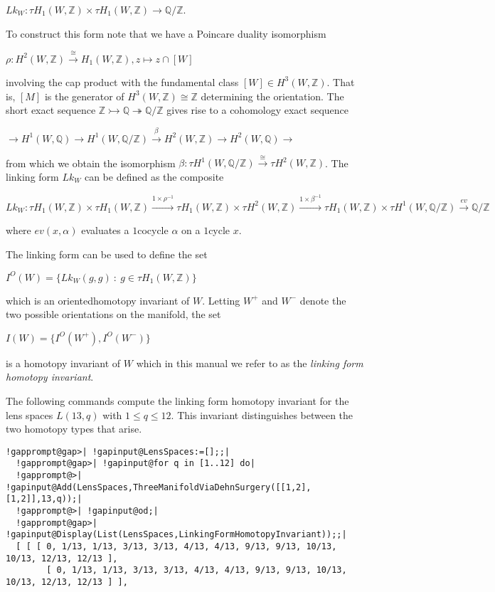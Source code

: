 \documentclass[a4paper,11pt]{report}
\begin{document}
{{$Lk_W\colon \tau H_1(W,\mathbb Z) \times \tau H_1(W,\mathbb Z) \longrightarrow
\mathbb Q/\mathbb Z$. 

To construct this form note that we have a Poincare duality isomorphism 

$\rho\colon H^2(W,\mathbb Z) \stackrel{\cong}{\longrightarrow} H_1(W,\mathbb
Z), z \mapsto z\cap [W]$ 

involving the cap product with the fundamental class $[W]\in H^3(W,\mathbb Z)$. That is, $[M]$ is the generator of $H^3(W,\mathbb Z)\cong \mathbb Z$ determining the orientation. The short exact sequence $\mathbb Z \rightarrowtail \mathbb Q \twoheadrightarrow \mathbb Q/\mathbb Z$ gives rise to a cohomology exact sequence 

$ \rightarrow H^1(W,\mathbb Q) \rightarrow H^1(W,\mathbb Q/\mathbb Z)
\stackrel{\beta}{\longrightarrow} H^2(W,\mathbb Z) \rightarrow H^2(W,\mathbb
Q) \rightarrow $ 

 from which we obtain the isomorphism $\beta \colon \tau H^1(W,\mathbb Q/\mathbb Z) \stackrel{\cong}{\longrightarrow}
\tau H^2(W,\mathbb Z)$. The linking form $Lk_W$ can be defined as the composite 

 $Lk_W\colon \tau H_1(W,\mathbb Z) \times \tau H_1(W,\mathbb Z)
\stackrel{1\times \rho^{-1}}{\longrightarrow} \tau H_1(W,\mathbb Z) \times
\tau H^2(W,\mathbb Z) \stackrel{1\times \beta^{-1}}{\longrightarrow} \tau
H_1(W,\mathbb Z) \times \tau H^1(W,\mathbb Q/\mathbb Z)
\stackrel{ev}{\longrightarrow } \mathbb Q/\mathbb Z $ 

where $ev(x,\alpha)$ evaluates a $1$\texttt{}cocycle $\alpha$ on a $1$\texttt{}cycle $x$. 

 The linking form can be used to define the set 

 $I^O(W) = \{Lk_W(g,g) \ \colon \ g\in \tau H_1(W,\mathbb Z)\}$ 

which is an oriented\texttt{}homotopy invariant of $W$. Letting $W^+$ and $W^-$ denote the two possible orientations on the manifold, the set 

 $I(W) =\{I^O(W^+), I^O(W^-)\}$ 

is a homotopy invariant of $W$ which in this manual we refer to as the \emph{linking form homotopy invariant}. 

 The following commands compute the linking form homotopy invariant for the
lens spaces $L(13,q)$ with $1\le q\le 12$. This invariant distinguishes between the two homotopy types that arise. 
\begin{Verbatim}[commandchars=!@|,fontsize=\small,frame=single,label=Example]
  !gapprompt@gap>| !gapinput@LensSpaces:=[];;|
  !gapprompt@gap>| !gapinput@for q in [1..12] do|
  !gapprompt@>| !gapinput@Add(LensSpaces,ThreeManifoldViaDehnSurgery([[1,2],[1,2]],13,q));|
  !gapprompt@>| !gapinput@od;|
  !gapprompt@gap>| !gapinput@Display(List(LensSpaces,LinkingFormHomotopyInvariant));;|
  [ [ [ 0, 1/13, 1/13, 3/13, 3/13, 4/13, 4/13, 9/13, 9/13, 10/13, 10/13, 12/13, 12/13 ], 
        [ 0, 1/13, 1/13, 3/13, 3/13, 4/13, 4/13, 9/13, 9/13, 10/13, 10/13, 12/13, 12/13 ] ], 
  

\end{Verbatim}}}
\end{document}
